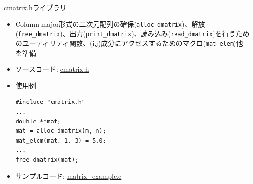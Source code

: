 \begin{frame}[t,fragile]{cmatrix.hライブラリ}
  \begin{itemize}
  \item Column-major形式の二次元配列の確保({\tt alloc\_dmatrix})、解放({\tt free\_dmatrix})、出力({\tt print\_dmatrix})、読み込み({\tt read\_dmatrix})を行うためのユーティリティ関数、(i,j)成分にアクセスするためのマクロ({\tt mat\_elem})他を準備
  \item ソースコード: \href{https://github.com/todo-group/computer-experiments/blob/master/exercise/include/cmatrix.h}{cmatrix.h}
  \item 使用例
\begin{lstlisting}
#include "cmatrix.h"
...
double **mat;
mat = alloc_dmatrix(m, n);
mat_elem(mat, 1, 3) = 5.0;
...
free_dmatrix(mat);
\end{lstlisting}
  \item サンプルコード: \href{https://github.com/todo-group/computer-experiments/blob/master/exercise/matrix/matrix_example.c}{matrix\_example.c}
  \end{itemize}
\end{frame}
